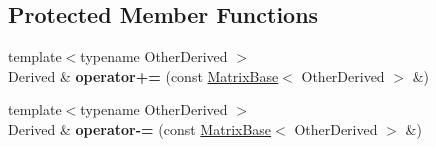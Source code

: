 \subsection*{Protected Member Functions}
\begin{DoxyCompactItemize}
\item 
\mbox{\label{class_eigen_1_1_array_base_a1bed9255f01f8a51dd6cb7e4ab2925c9}} 
{\footnotesize template$<$typename Other\+Derived $>$ }\\Derived \& {\bfseries operator+=} (const \mbox{\hyperlink{class_eigen_1_1_matrix_base}{Matrix\+Base}}$<$ Other\+Derived $>$ \&)
\item 
\mbox{\label{class_eigen_1_1_array_base_ade439053f0c517a6b94285223b1d1f5b}} 
{\footnotesize template$<$typename Other\+Derived $>$ }\\Derived \& {\bfseries operator-\/=} (const \mbox{\hyperlink{class_eigen_1_1_matrix_base}{Matrix\+Base}}$<$ Other\+Derived $>$ \&)
\end{DoxyCompactItemize}
